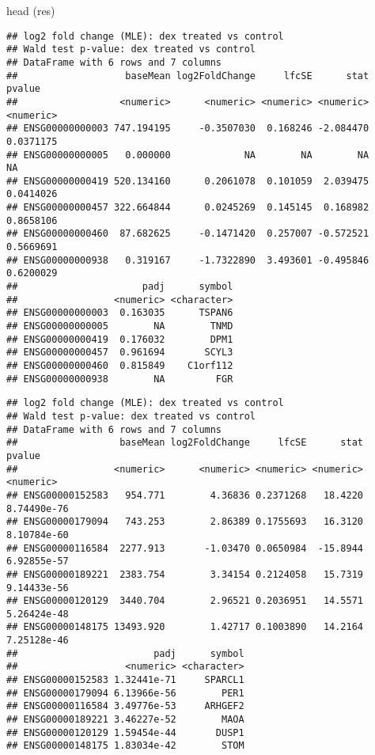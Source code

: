\documentclass[
]{article}
\newenvironment{Shaded}{\begin{snugshade}}{\end{snugshade}}
\newcommand{\CommentTok}[1]{\textcolor[rgb]{0.56,0.35,0.01}{\textit{#1}}}
\newcommand{\FunctionTok}[1]{\textcolor[rgb]{0.00,0.00,0.00}{#1}}
\newcommand{\NormalTok}[1]{#1}
\newcommand{\OtherTok}[1]{\textcolor[rgb]{0.56,0.35,0.01}{#1}}
\newcommand{\SpecialCharTok}[1]{\textcolor[rgb]{0.00,0.00,0.00}{#1}}
\begin{document}
\begin{Shaded}
\begin{Highlighting}[]
\FunctionTok{head}\NormalTok{ (res)}
\end{Highlighting}
\end{Shaded}

\begin{verbatim}
## log2 fold change (MLE): dex treated vs control 
## Wald test p-value: dex treated vs control 
## DataFrame with 6 rows and 7 columns
##                   baseMean log2FoldChange     lfcSE      stat    pvalue
##                  <numeric>      <numeric> <numeric> <numeric> <numeric>
## ENSG00000000003 747.194195     -0.3507030  0.168246 -2.084470 0.0371175
## ENSG00000000005   0.000000             NA        NA        NA        NA
## ENSG00000000419 520.134160      0.2061078  0.101059  2.039475 0.0414026
## ENSG00000000457 322.664844      0.0245269  0.145145  0.168982 0.8658106
## ENSG00000000460  87.682625     -0.1471420  0.257007 -0.572521 0.5669691
## ENSG00000000938   0.319167     -1.7322890  3.493601 -0.495846 0.6200029
##                      padj      symbol
##                 <numeric> <character>
## ENSG00000000003  0.163035      TSPAN6
## ENSG00000000005        NA        TNMD
## ENSG00000000419  0.176032        DPM1
## ENSG00000000457  0.961694       SCYL3
## ENSG00000000460  0.815849    C1orf112
## ENSG00000000938        NA         FGR
\end{verbatim}

\begin{Shaded}
\end{Shaded}

\begin{verbatim}
## log2 fold change (MLE): dex treated vs control 
## Wald test p-value: dex treated vs control 
## DataFrame with 6 rows and 7 columns
##                  baseMean log2FoldChange     lfcSE      stat      pvalue
##                 <numeric>      <numeric> <numeric> <numeric>   <numeric>
## ENSG00000152583   954.771        4.36836 0.2371268   18.4220 8.74490e-76
## ENSG00000179094   743.253        2.86389 0.1755693   16.3120 8.10784e-60
## ENSG00000116584  2277.913       -1.03470 0.0650984  -15.8944 6.92855e-57
## ENSG00000189221  2383.754        3.34154 0.2124058   15.7319 9.14433e-56
## ENSG00000120129  3440.704        2.96521 0.2036951   14.5571 5.26424e-48
## ENSG00000148175 13493.920        1.42717 0.1003890   14.2164 7.25128e-46
##                        padj      symbol
##                   <numeric> <character>
## ENSG00000152583 1.32441e-71     SPARCL1
## ENSG00000179094 6.13966e-56        PER1
## ENSG00000116584 3.49776e-53     ARHGEF2
## ENSG00000189221 3.46227e-52        MAOA
## ENSG00000120129 1.59454e-44       DUSP1
## ENSG00000148175 1.83034e-42        STOM
\end{verbatim}
\end{document}
